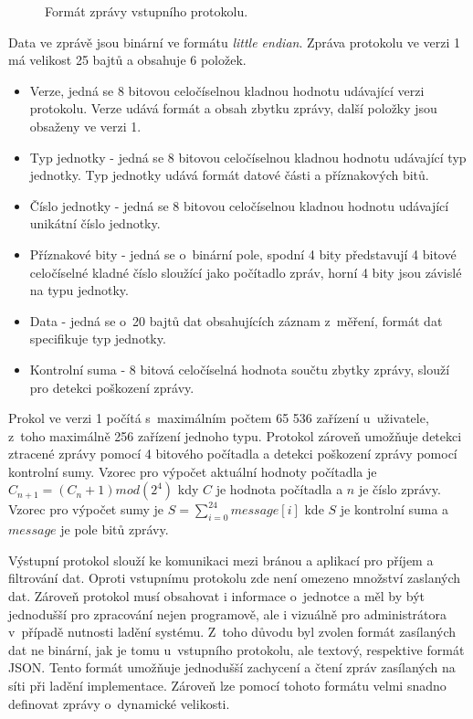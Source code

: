 \begin{figure}[ht]
  \centering
  
  \caption{Formát zprávy vstupního protokolu.}
  \label{pic:internal_protocol}
\end{figure}

Data ve zprávě jsou binární ve formátu \textit{little endian}. Zpráva protokolu ve verzi 1 má velikost 25 bajtů a obsahuje 6 položek.
\begin{itemize}
    \item Verze, jedná se 8 bitovou celočíselnou kladnou hodnotu udávající verzi protokolu. Verze udává formát a obsah zbytku zprávy, další položky jsou obsaženy ve verzi 1.
    \item Typ jednotky - jedná se 8 bitovou celočíselnou kladnou hodnotu udávající typ jednotky. Typ jednotky udává formát datové části a příznakových bitů.
    \item Číslo jednotky - jedná se 8 bitovou celočíselnou kladnou hodnotu udávající unikátní číslo jednotky.
    \item Příznakové bity - jedná se o~binární pole, spodní 4 bity představují 4 bitové celočíselné kladné číslo sloužící jako počítadlo zpráv, horní 4 bity jsou závislé na typu jednotky.
    \item Data - jedná se o~20 bajtů dat obsahujících záznam z~měření, formát dat specifikuje typ jednotky.
    \item Kontrolní suma - 8 bitová celočíselná hodnota součtu zbytky zprávy, slouží pro detekci poškození zprávy.
\end{itemize}
Prokol ve verzi 1 počítá s~maximálním počtem 65 536 zařízení u~uživatele, z~toho maximálně 256 zařízení jednoho typu. Protokol zároveň umožňuje detekci ztracené zprávy pomocí 4 bitového počítadla a detekci poškození zprávy pomocí kontrolní sumy. Vzorec pro výpočet aktuální hodnoty počítadla je $C_{n+1}=(C_{n}+1)mod(2^4)$ kdy $C$ je hodnota počítadla a $n$ je číslo zprávy. Vzorec pro výpočet sumy je $S = \sum_{i=0}^{24}message[i]$ kde $S$ je kontrolní suma a $message$ je pole bitů zprávy.

\label{sec:output_protocol}
Výstupní protokol slouží ke komunikaci mezi bránou a aplikací pro příjem a filtrování dat. Oproti vstupnímu protokolu zde není omezeno množství zaslaných dat. Zároveň protokol musí obsahovat i informace o~jednotce a měl by být jednodušší pro zpracování nejen programově, ale i vizuálně pro administrátora v~případě nutnosti ladění systému. Z~toho důvodu byl zvolen formát zasílaných dat ne binární, jak je tomu u~vstupního protokolu, ale textový, respektive formát JSON. Tento formát umožňuje jednodušší zachycení a čtení zpráv zasílaných na síti při ladění implementace. Zároveň lze pomocí tohoto formátu velmi snadno definovat zprávy o~dynamické velikosti. 

